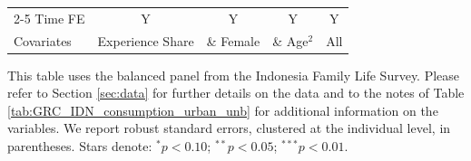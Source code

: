 \begin{table}[htbp]
\begin{threeparttable}
\begin{tabular}{l cccc}
\cmidrule{2-5} Time FE & Y & Y & Y & Y \\ Covariates & Experience Share & \& Female & \& Age$^2$ & All \\ \bottomrule \end{tabular} \begin{tablenotes}[flushleft] \footnotesize \item{This table uses the balanced panel from the Indonesia Family Life Survey. Please refer to Section \ref{sec:data} for further details on the data and to the notes of Table \ref{tab:GRC_IDN_consumption_urban_unb} for additional information on the variables. We report robust standard errors, clustered at the individual level, in parentheses. Stars denote: $^{*} p<0.10$; $^{**} p<0.05$; $^{***} p<0.01$.} \end{tablenotes} \end{threeparttable} \end{table}

